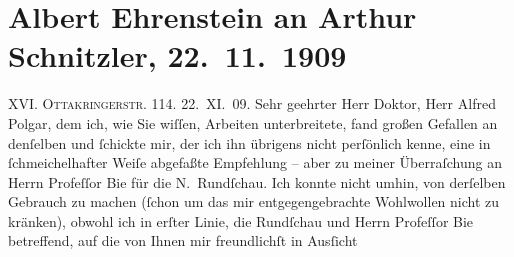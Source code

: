 

         
         \renewcommand{\erwaehntePersonen}{Personen: Oskar Bie, Albert Ehrenstein, Samuel Fischer, Alfred Polgar}
         \renewcommand{\erwaehnteOrte}{Orte: Berlin, Ottakringerstraße, Wien}
         \renewcommand{\erwaehnteWerke}{Werke: Die alte Geschichte, Die neue Rundschau, Mitgefühl, Saccumum, Tai-Gin, Tod des Zehir eddin Muhammed Baber, Tubutsch}
               \section[Albert Ehrenstein an Arthur Schnitzler, 22. 11. 1909]{ Albert Ehrenstein an Arthur Schnitzler, 22. 11. 1909}\nopagebreak{}\rehead{ }\begin{ledgroupsized}[t]{13cm}\normalsize\beginnumbering \toendnotes[C]{\smallbreak\pagebreak[2]} 
\toendnotes[C]{\smallbreak}\pstart
           \noindent{}{\pb}XVI. \textsc{Ottakringerstr.}
                        114. \hfill 22. XI. 09. \pend
           \pstart{}Sehr geehrter Herr Doktor,\pend\pstart
           Herr Alfred Polgar, dem ich, wie Sie wiſſen,
               Arbeiten unterbreitete, fand großen Gefallen an denſelben und ſchickte mir, der ich
               ihn übrigens nicht perſönlich kenne, eine in ſchmeichelhafter Weiſe abgefaßte
               Empfehlung – aber zu meiner Überraſchung an Herrn Profeſſor Bie für die N. Rundſchau.
               Ich konnte nicht umhin, von derſelben Gebrauch zu machen (ſchon um das mir
               entgegengebrachte Wohlwollen nicht zu kränken), obwohl ich in erſter Linie, die Rundſchau und Herrn Profeſſor Bie betreffend, auf die {\pb}von Ihnen mir freundlichſt in Ausſicht

\end{ledgroupsized}
